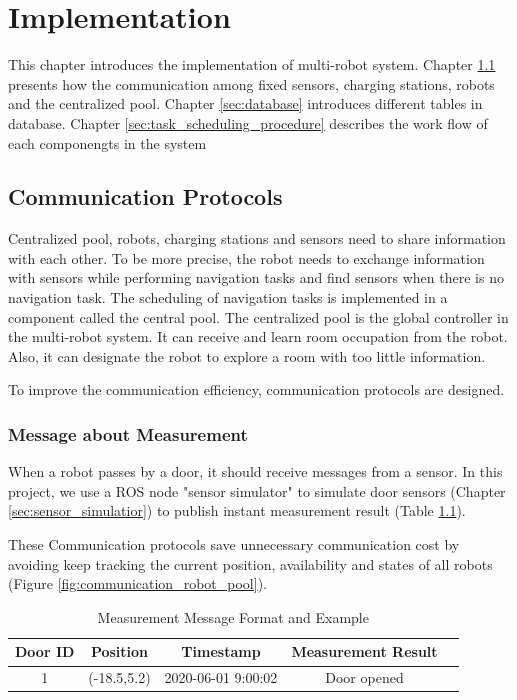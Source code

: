 \chapter{Implementation}
This chapter introduces the implementation of multi-robot system. Chapter \ref{sec:communication_protocols} presents how the communication among fixed sensors, charging stations, robots and the centralized pool. Chapter \ref{sec:database} introduces different tables in database. Chapter \ref{sec:task_scheduling_procedure} describes the work flow of each componengts in the system

\section{Communication Protocols}
\label{sec:communication_protocols}

Centralized pool, robots, charging stations and sensors need to share information with each other.
To be more precise, the robot needs to exchange information with sensors while performing navigation tasks and find sensors when there is no navigation task. The scheduling of navigation tasks is implemented in a component called the central pool. The centralized pool is the global controller in the multi-robot system. It can receive and learn room occupation from the robot. Also, it can designate the robot to explore a room with too little information.

To improve the communication efficiency, communication protocols are designed. 

\subsection{Message about Measurement}
\label{sec:measurement_message}
When a robot passes by a door, it should receive messages from a sensor. In this project, we use a ROS node "sensor simulator" to simulate door sensors (Chapter \ref{sec:sensor_simulatior}) to publish instant measurement result (Table \ref{tab:sensor_message}).

These Communication protocols save unnecessary communication cost by avoiding keep tracking the current position, availability and states of all robots (Figure \ref{fig:communication_robot_pool}).

\begin{table}[htb]
\centering
\begin{tabular}{|c|c|c|c|c|} 
\hline
Door ID  & Position& Timestamp & Measurement Result \\
\hline\hline
1&(-18.5,5.2) & 2020-06-01 9:00:02 & Door opened \\ [1ex] 
\hline
\end{tabular}
\caption{Measurement Message Format and Example}
\label{tab:sensor_message}
\end{table}
	

